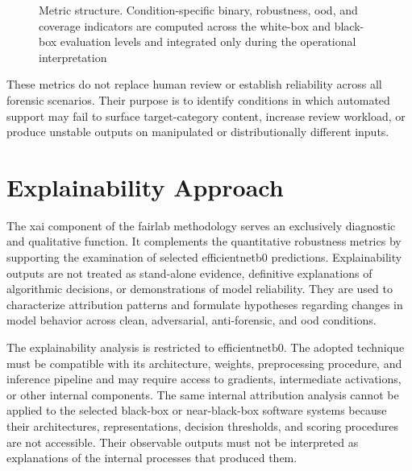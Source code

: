 \begin{figure}[H]
{%
}
\caption[Metric structure]{Metric structure. Condition-specific binary,
robustness, \gls{ood}, and coverage indicators are computed across the
white-box and black-box evaluation levels and integrated only during the
operational interpretation}
\label{fig:methodology-metric-layers}
\end{figure}

These metrics do not replace human review or establish reliability across all
forensic scenarios. Their purpose is to identify conditions in which automated
support may fail to surface target-category content, increase review workload,
or produce unstable outputs on manipulated or distributionally different
inputs.



\section{Explainability Approach}
\label{sec:methodology-explainability}

The \gls{xai} component of the \gls{fairlab} methodology serves an exclusively
diagnostic and qualitative function. It complements the quantitative robustness
metrics by supporting the examination of selected \gls{efficientnetb0}
predictions. Explainability outputs are not treated
as stand-alone evidence, definitive explanations of algorithmic decisions, or
demonstrations of model reliability. They are used to characterize attribution
patterns and formulate hypotheses regarding changes in model behavior across
clean, adversarial, anti-forensic, and \gls{ood} conditions.

The explainability analysis is restricted to \gls{efficientnetb0}.
The adopted technique must be compatible with its architecture,
weights, preprocessing procedure, and inference pipeline and may require access
to gradients, intermediate activations, or other internal components. The same
internal attribution analysis cannot be applied to the selected black-box or
near-black-box software systems because their architectures, representations,
decision thresholds, and scoring procedures are not accessible. Their
observable outputs must not be interpreted as explanations of the internal
processes that produced them.

